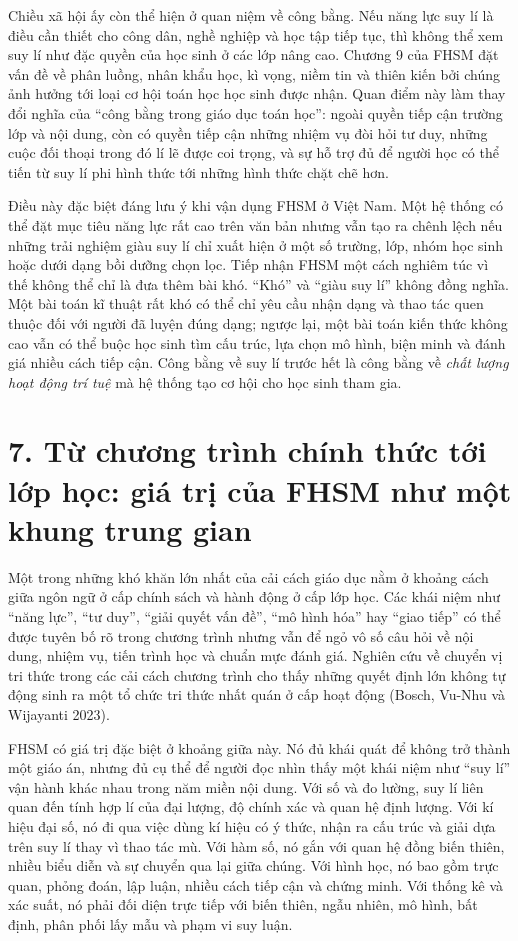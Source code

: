 Chiều xã hội ấy còn thể hiện ở quan niệm về công bằng. Nếu năng lực suy lí là
điều cần thiết cho công dân, nghề nghiệp và học tập tiếp tục, thì không thể
xem suy lí như đặc quyền của học sinh ở các lớp nâng cao. Chương 9 của FHSM
đặt vấn đề về phân luồng, nhân khẩu học, kì vọng, niềm tin và thiên kiến bởi
chúng ảnh hưởng tới loại cơ hội toán học học sinh được nhận. Quan điểm này làm
thay đổi nghĩa của ``công bằng trong giáo dục toán học'': ngoài quyền tiếp cận
trường lớp và nội dung, còn có quyền tiếp cận những nhiệm vụ đòi hỏi tư duy,
những cuộc đối thoại trong đó lí lẽ được coi trọng, và sự hỗ trợ đủ để người
học có thể tiến từ suy lí phi hình thức tới những hình thức chặt chẽ hơn.

Điều này đặc biệt đáng lưu ý khi vận dụng FHSM ở Việt Nam. Một hệ thống có thể
đặt mục tiêu năng lực rất cao trên văn bản nhưng vẫn tạo ra chênh lệch nếu
những trải nghiệm giàu suy lí chỉ xuất hiện ở một số trường, lớp, nhóm học
sinh hoặc dưới dạng bồi dưỡng chọn lọc. Tiếp nhận FHSM một cách nghiêm túc vì
thế không thể chỉ là đưa thêm bài khó. ``Khó'' và ``giàu suy lí'' không đồng
nghĩa. Một bài toán kĩ thuật rất khó có thể chỉ yêu cầu nhận dạng và thao tác
quen thuộc đối với người đã luyện đúng dạng; ngược lại, một bài toán kiến thức
không cao vẫn có thể buộc học sinh tìm cấu trúc, lựa chọn mô hình, biện minh
và đánh giá nhiều cách tiếp cận. Công bằng về suy lí trước hết là công bằng về
\emph{chất lượng hoạt động trí tuệ} mà hệ thống tạo cơ hội cho học sinh tham
gia.

\section*{7. Từ chương trình chính thức tới lớp học: giá trị của FHSM như một khung trung gian}

Một trong những khó khăn lớn nhất của cải cách giáo dục nằm ở khoảng cách
giữa ngôn ngữ ở cấp chính sách và hành động ở cấp lớp học. Các khái niệm như
``năng lực'', ``tư duy'', ``giải quyết vấn đề'', ``mô hình hóa'' hay ``giao
tiếp'' có thể được tuyên bố rõ trong chương trình nhưng vẫn để ngỏ vô số câu
hỏi về nội dung, nhiệm vụ, tiến trình học và chuẩn mực đánh giá. Nghiên cứu về
chuyển vị tri thức trong các cải cách chương trình cho thấy những quyết định
lớn không tự động sinh ra một tổ chức tri thức nhất quán ở cấp hoạt động
(Bosch, Vu-Nhu và Wijayanti 2023).

FHSM có giá trị đặc biệt ở khoảng giữa này. Nó đủ khái quát để không trở thành
một giáo án, nhưng đủ cụ thể để người đọc nhìn thấy một khái niệm như ``suy
lí'' vận hành khác nhau trong năm miền nội dung. Với số và đo lường, suy lí
liên quan đến tính hợp lí của đại lượng, độ chính xác và quan hệ định lượng.
Với kí hiệu đại số, nó đi qua việc dùng kí hiệu có ý thức, nhận ra cấu trúc
và giải dựa trên suy lí thay vì thao tác mù. Với hàm số, nó gắn với quan hệ
đồng biến thiên, nhiều biểu diễn và sự chuyển qua lại giữa chúng. Với hình
học, nó bao gồm trực quan, phỏng đoán, lập luận, nhiều cách tiếp cận và chứng
minh. Với thống kê và xác suất, nó phải đối diện trực tiếp với biến thiên,
ngẫu nhiên, mô hình, bất định, phân phối lấy mẫu và phạm vi suy luận.

